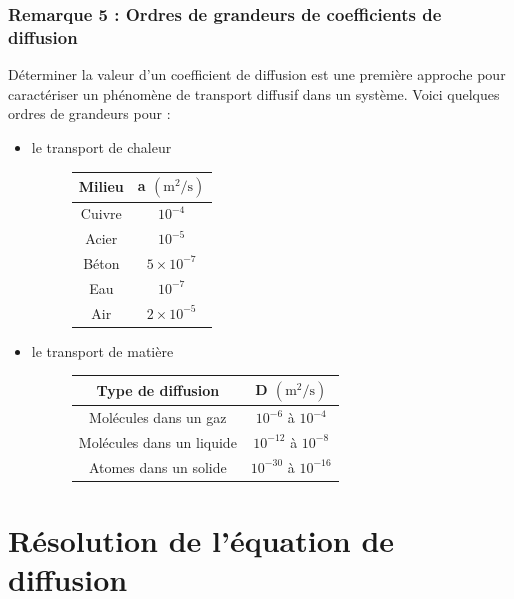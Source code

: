 \documentclass[11pt,a4paper]{report}
\begin{document}
\subsubsection{Remarque 5 : Ordres de grandeurs de coefficients de diffusion}
Déterminer la valeur d'un coefficient de diffusion est une première approche pour caractériser un phénomène de transport diffusif dans un système. Voici quelques ordres de grandeurs pour :\\
\begin{itemize}
	\item le transport de chaleur
	\begin{figure}[h!]
		\begin{center}
			\begin{tabular}{|c|c|}
			\hline
			\textbf{Milieu} & a $(\text{m}^2/\text{s})$\\
			\hline
			Cuivre & $10^{-4}$\\
			\hline
			Acier & $10^{-5}$\\
			\hline
			Béton & $5\times10^{-7}$ \\
			\hline
			Eau & $10^{-7}$\\
			\hline
			Air & $2\times 10^{-5}$\\
			\hline
			\end{tabular}
		\end{center}
	\end{figure}
	
	\item le transport de matière
	\begin{figure}[h!]
		\begin{center}
			\begin{tabular}{|c|c|}
			\hline
			\textbf{Type de diffusion} & D $(\text{m}^2/\text{s})$\\
			\hline
			Molécules dans un gaz & $10^{-6}$ à $10^{-4}$\\
			\hline
			Molécules dans un liquide & $10^{-12}$ à $10^{-8}$\\
			\hline
			Atomes dans un solide & $10^{-30}$ à $10^{-16}$ \\
			\hline
			\end{tabular}
		\end{center}
	\end{figure}
\end{itemize}
\newpage
\section{Résolution de l'équation de diffusion}
\end{document}
